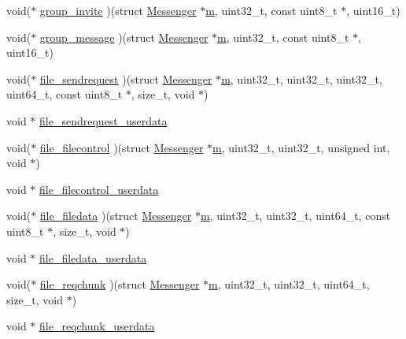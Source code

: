 \begin{DoxyCompactItemize}
void($\ast$ \hyperlink{struct_messenger_a60eaca4be38363ad7bc9d454fee814f4}{group\+\_\+invite} )(struct \hyperlink{struct_messenger}{Messenger} $\ast$\hyperlink{_messenger__test_8c_aea6eb6c7c30a659f1b0dee83eaf03ea2}{m}, uint32\+\_\+t, const uint8\+\_\+t $\ast$, uint16\+\_\+t)
\item 
void($\ast$ \hyperlink{struct_messenger_a41600d8061cac9e1ac8cef62bc690149}{group\+\_\+message} )(struct \hyperlink{struct_messenger}{Messenger} $\ast$\hyperlink{_messenger__test_8c_aea6eb6c7c30a659f1b0dee83eaf03ea2}{m}, uint32\+\_\+t, const uint8\+\_\+t $\ast$, uint16\+\_\+t)
\item 
void($\ast$ \hyperlink{struct_messenger_a1d83804ee0bfe9249fda05cdd755a37f}{file\+\_\+sendrequest} )(struct \hyperlink{struct_messenger}{Messenger} $\ast$\hyperlink{_messenger__test_8c_aea6eb6c7c30a659f1b0dee83eaf03ea2}{m}, uint32\+\_\+t, uint32\+\_\+t, uint32\+\_\+t, uint64\+\_\+t, const uint8\+\_\+t $\ast$, size\+\_\+t, void $\ast$)
\item 
void $\ast$ \hyperlink{struct_messenger_a26be37effc113183fae96f3a7279ebb0}{file\+\_\+sendrequest\+\_\+userdata}
\item 
void($\ast$ \hyperlink{struct_messenger_a1e3990148af844c986e09a946650f7f3}{file\+\_\+filecontrol} )(struct \hyperlink{struct_messenger}{Messenger} $\ast$\hyperlink{_messenger__test_8c_aea6eb6c7c30a659f1b0dee83eaf03ea2}{m}, uint32\+\_\+t, uint32\+\_\+t, unsigned int, void $\ast$)
\item 
void $\ast$ \hyperlink{struct_messenger_a34ba46a8cf11b02a23f7a7d219608c3b}{file\+\_\+filecontrol\+\_\+userdata}
\item 
void($\ast$ \hyperlink{struct_messenger_a2f2875b7bf0dda7ed90908d4e1139493}{file\+\_\+filedata} )(struct \hyperlink{struct_messenger}{Messenger} $\ast$\hyperlink{_messenger__test_8c_aea6eb6c7c30a659f1b0dee83eaf03ea2}{m}, uint32\+\_\+t, uint32\+\_\+t, uint64\+\_\+t, const uint8\+\_\+t $\ast$, size\+\_\+t, void $\ast$)
\item 
void $\ast$ \hyperlink{struct_messenger_a69c2b7ef494a50568b37c4ade72fdb62}{file\+\_\+filedata\+\_\+userdata}
\item 
void($\ast$ \hyperlink{struct_messenger_a8e913b9866264d0e9518d54b08cc4eeb}{file\+\_\+reqchunk} )(struct \hyperlink{struct_messenger}{Messenger} $\ast$\hyperlink{_messenger__test_8c_aea6eb6c7c30a659f1b0dee83eaf03ea2}{m}, uint32\+\_\+t, uint32\+\_\+t, uint64\+\_\+t, size\+\_\+t, void $\ast$)
\item 
void $\ast$ \hyperlink{struct_messenger_afab0bf4f4929791bf8cab5603f400391}{file\+\_\+reqchunk\+\_\+userdata}

\end{DoxyCompactItemize}
